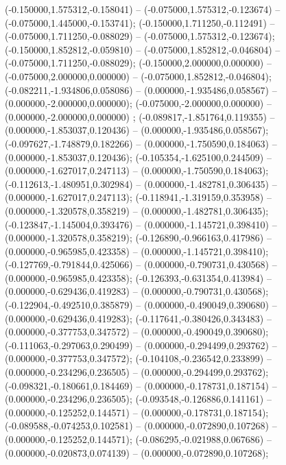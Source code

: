  (-0.150000,1.575312,-0.158041) -- (-0.075000,1.575312,-0.123674) -- (-0.075000,1.445000,-0.153741);
 (-0.150000,1.711250,-0.112491) -- (-0.075000,1.711250,-0.088029) -- (-0.075000,1.575312,-0.123674);
 (-0.150000,1.852812,-0.059810) -- (-0.075000,1.852812,-0.046804) -- (-0.075000,1.711250,-0.088029);
 (-0.150000,2.000000,0.000000) -- (-0.075000,2.000000,0.000000) -- (-0.075000,1.852812,-0.046804);
 (-0.082211,-1.934806,0.058086) -- (0.000000,-1.935486,0.058567) -- (0.000000,-2.000000,0.000000);
 (-0.075000,-2.000000,0.000000) -- (0.000000,-2.000000,0.000000) ;
 (-0.089817,-1.851764,0.119355) -- (0.000000,-1.853037,0.120436) -- (0.000000,-1.935486,0.058567);
 (-0.097627,-1.748879,0.182266) -- (0.000000,-1.750590,0.184063) -- (0.000000,-1.853037,0.120436);
 (-0.105354,-1.625100,0.244509) -- (0.000000,-1.627017,0.247113) -- (0.000000,-1.750590,0.184063);
 (-0.112613,-1.480951,0.302984) -- (0.000000,-1.482781,0.306435) -- (0.000000,-1.627017,0.247113);
 (-0.118941,-1.319159,0.353958) -- (0.000000,-1.320578,0.358219) -- (0.000000,-1.482781,0.306435);
 (-0.123847,-1.145004,0.393476) -- (0.000000,-1.145721,0.398410) -- (0.000000,-1.320578,0.358219);
 (-0.126890,-0.966163,0.417986) -- (0.000000,-0.965985,0.423358) -- (0.000000,-1.145721,0.398410);
 (-0.127769,-0.791844,0.425066) -- (0.000000,-0.790731,0.430568) -- (0.000000,-0.965985,0.423358);
 (-0.126393,-0.631354,0.413984) -- (0.000000,-0.629436,0.419283) -- (0.000000,-0.790731,0.430568);
 (-0.122904,-0.492510,0.385879) -- (0.000000,-0.490049,0.390680) -- (0.000000,-0.629436,0.419283);
 (-0.117641,-0.380426,0.343483) -- (0.000000,-0.377753,0.347572) -- (0.000000,-0.490049,0.390680);
 (-0.111063,-0.297063,0.290499) -- (0.000000,-0.294499,0.293762) -- (0.000000,-0.377753,0.347572);
 (-0.104108,-0.236542,0.233899) -- (0.000000,-0.234296,0.236505) -- (0.000000,-0.294499,0.293762);
 (-0.098321,-0.180661,0.184469) -- (0.000000,-0.178731,0.187154) -- (0.000000,-0.234296,0.236505);
 (-0.093548,-0.126886,0.141161) -- (0.000000,-0.125252,0.144571) -- (0.000000,-0.178731,0.187154);
 (-0.089588,-0.074253,0.102581) -- (0.000000,-0.072890,0.107268) -- (0.000000,-0.125252,0.144571);
 (-0.086295,-0.021988,0.067686) -- (0.000000,-0.020873,0.074139) -- (0.000000,-0.072890,0.107268);

